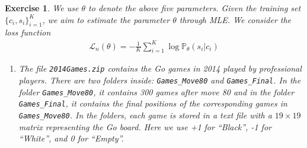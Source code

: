 \documentclass[12pt]{article}
\theoremstyle{colon}
\newtheorem{exercise}{Exercise}
\begin{document}
\begin{exercise}
  We use $\theta$ to denote the above five parameters. Given the training set $\{c_i, s_i\}_{i=1}^K$, we aim to estimate the parameter $\theta$ through MLE. We consider the loss function
  \begin{gather*}
    \mathcal{L}_n (\theta) = -\frac{1}{K} \sum_{i=1}^K \log \mathbb{P}_\theta(s_i | c_i)
  \end{gather*}
  \begin{enumerate}[label=\arabic*)]
    \item The file \texttt{2014Games.zip} contains the Go games in 2014 played by professional players. There are two folders inside: \texttt{Games\_Move80} and \texttt{Games\_Final}. In the folder \texttt{Games\_Move80}, it contains 300 games after move 80 and in the folder \texttt{Games\_Final}, it contains the final positions of the corresponding games in \texttt{Games\_Move80}. In the folders, each game is stored in a text file with a $19 \times 19$ matrix representing the Go board. Here we use +1 for ``Black'', -1 for ``White'', and 0 for ``Empty''.


\end{enumerate}
\end{exercise}
\end{document}
